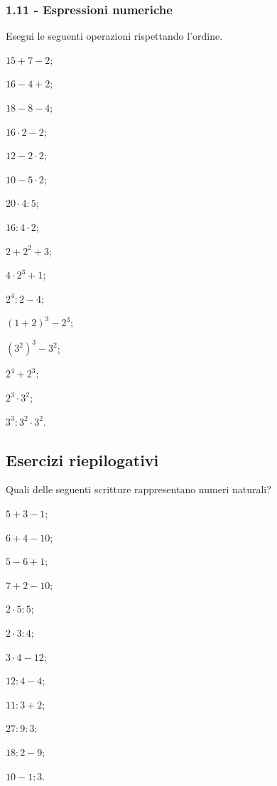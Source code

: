 \subsubsection*{1.11 - Espressioni numeriche}

\begin{esercizio}[\Ast]
\label{ese:1.27}
Esegui le seguenti operazioni rispettando l'ordine.
 \begin{multicols}{4}
 \begin{enumeratea}
 \item $15+7-2$;
 \item $16-4+2$;
 \item $18-8-4$;
 \item $16\cdot 2-2$;
 \item $12-2\cdot 2$;
 \item $10-5\cdot 2$;
 \item $20\cdot 4:5$;
 \item $16:4\cdot 2$;
 \item $2+2^2+3$;
 \item $4\cdot 2^3+1$;
 \item $2^4:2-4$;
 \item $(1+2)^3-2^3$;
 \item $\left(3^2\right)^3-3^2$;
 \item $2^4+2^3$;
 \item $2^3\cdot 3^2$;
 \item $3^3:3^2\cdot 3^2$.
 \end{enumeratea}
 \end{multicols}
\end{esercizio}

\subsection{Esercizi riepilogativi}
\begin{esercizio}[\Ast]
Quali delle seguenti scritture rappresentano numeri naturali?
 \begin{multicols}{4}
 \begin{enumeratea}
 \item $5+3-1$;
 \item $6+4-10$;
 \item $5-6+1$;
 \item $7+2-10$;
 \item $2\cdot 5:5$;
 \item $2\cdot 3:4$;
 \item $3\cdot 4-12$;
 \item $12:4-4$;
 \item $11:3+2$;
 \item $27:9:3$;
 \item $18:2-9$;
 \item $10-1:3$.
 \end{enumeratea}
 \end{multicols}
\end{esercizio}


